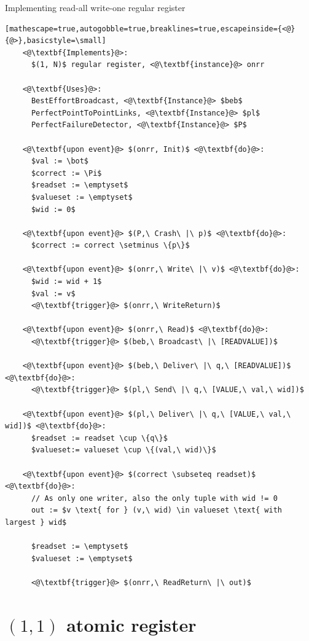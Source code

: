 \documentclass[a4paper]{scrreprt}
\begin{document}
\begin{library}{Implementing read-all write-one regular register}
  \begin{lstlisting}[mathescape=true,autogobble=true,breaklines=true,escapeinside={<@}{@>},basicstyle=\small]
    <@\textbf{Implements}@>:
      $(1, N)$ regular register, <@\textbf{instance}@> onrr

    <@\textbf{Uses}@>:
      BestEffortBroadcast, <@\textbf{Instance}@> $beb$
      PerfectPointToPointLinks, <@\textbf{Instance}@> $pl$
      PerfectFailureDetector, <@\textbf{Instance}@> $P$

    <@\textbf{upon event}@> $(onrr, Init)$ <@\textbf{do}@>:
      $val := \bot$
      $correct := \Pi$
      $readset := \emptyset$
      $valueset := \emptyset$
      $wid := 0$

    <@\textbf{upon event}@> $(P,\ Crash\ |\ p)$ <@\textbf{do}@>:
      $correct := correct \setminus \{p\}$

    <@\textbf{upon event}@> $(onrr,\ Write\ |\ v)$ <@\textbf{do}@>:
      $wid := wid + 1$
      $val := v$
      <@\textbf{trigger}@> $(onrr,\ WriteReturn)$

    <@\textbf{upon event}@> $(onrr,\ Read)$ <@\textbf{do}@>:
      <@\textbf{trigger}@> $(beb,\ Broadcast\ |\ [READVALUE])$

    <@\textbf{upon event}@> $(beb,\ Deliver\ |\ q,\ [READVALUE])$ <@\textbf{do}@>:
      <@\textbf{trigger}@> $(pl,\ Send\ |\ q,\ [VALUE,\ val,\ wid])$

    <@\textbf{upon event}@> $(pl,\ Deliver\ |\ q,\ [VALUE,\ val,\ wid])$ <@\textbf{do}@>:
      $readset := readset \cup \{q\}$
      $valueset:= valueset \cup \{(val,\ wid)\}$

    <@\textbf{upon event}@> $(correct \subseteq readset)$ <@\textbf{do}@>:
      // As only one writer, also the only tuple with wid != 0
      out := $v \text{ for } (v,\ wid) \in valueset \text{ with largest } wid$

      $readset := \emptyset$
      $valueset := \emptyset$

      <@\textbf{trigger}@> $(onrr,\ ReadReturn\ |\ out)$

  \end{lstlisting}
\end{library}

\section{$(1, 1)$ atomic register}
\end{document}
